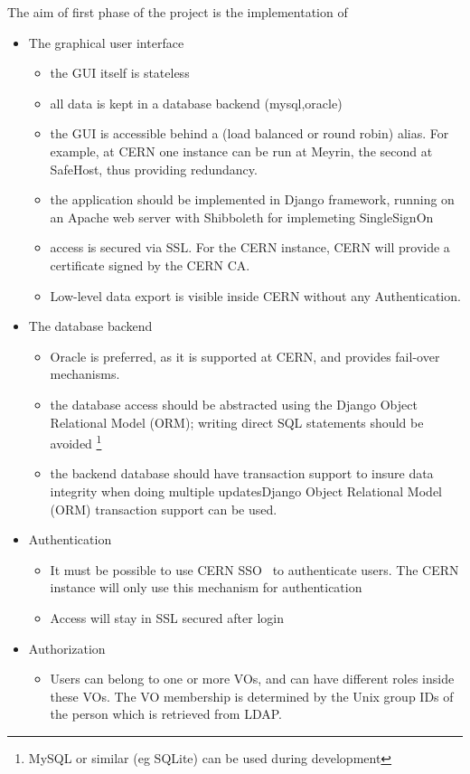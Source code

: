 The aim of first phase of the project is the implementation of 
\begin{itemize}
\item The graphical user interface 
\begin{itemize}
  \item the GUI itself is stateless
  \item all data is kept in a database backend (mysql,oracle)
  \item the GUI is accessible behind a (load balanced or round robin) alias. For example, at CERN one instance can be run at Meyrin, the second at SafeHost, thus providing redundancy.
  \item the application should be implemented in Django\cite{Django} framework, running on an Apache web server with Shibboleth for implemeting SingleSignOn   
  \item access is secured via SSL. For the CERN instance, CERN will provide a certificate signed by the CERN CA.
  \item Low-level data export is visible inside CERN without any Authentication.
\end{itemize}
\item The database backend
\begin{itemize}
  \item Oracle is preferred, as it is supported at CERN, and provides fail-over mechanisms. 
  \item the database access should be abstracted using the Django Object Relational Model (ORM)\cite{ORM}; writing direct SQL statements should be avoided \footnote{MySQL or similar (eg SQLite) can be used during development}
  \item the backend database should have transaction support to insure data integrity when doing multiple updatesDjango Object Relational Model (ORM)\cite{ORM} transaction support can be used.
\end{itemize}
\item Authentication
\begin{itemize}
\item It must be possible to use CERN SSO~\cite{CernSSO} to authenticate users. The CERN instance will only use this mechanism for authentication
\item Access will stay in SSL secured after login
\end{itemize}
\item Authorization
\begin{itemize}
\item Users can belong to one or more VOs, and can have different roles inside these VOs. The VO membership is determined by the Unix group IDs of the person which is retrieved from LDAP.

\end{itemize}
\end{itemize}
